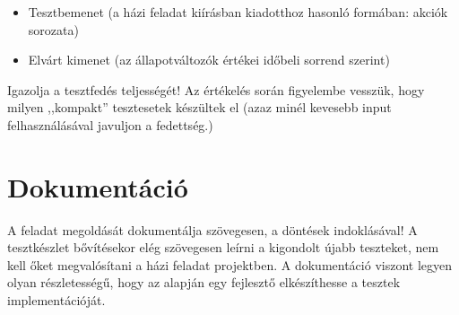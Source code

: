 \documentclass[a4paper]{article}
\begin{document}
\begin{itemize}
	\item Tesztbemenet (a házi feladat kiírásban kiadotthoz hasonló formában: akciók sorozata)
	\item Elvárt kimenet (az állapotváltozók értékei időbeli sorrend szerint)
\end{itemize}

Igazolja a tesztfedés teljességét! Az értékelés során figyelembe vesszük, hogy milyen ,,kompakt'' tesztesetek készültek el (azaz minél kevesebb input felhasználásával javuljon a fedettség.)


\section{Dokumentáció}
A feladat megoldását dokumentálja szövegesen, a döntések indoklásával! A tesztkészlet bővítésekor elég szövegesen leírni a kigondolt újabb teszteket, nem kell őket megvalósítani a házi feladat projektben. A dokumentáció viszont legyen olyan részletességű, hogy az alapján egy fejlesztő elkészíthesse a tesztek implementációját. 
\end{document}
